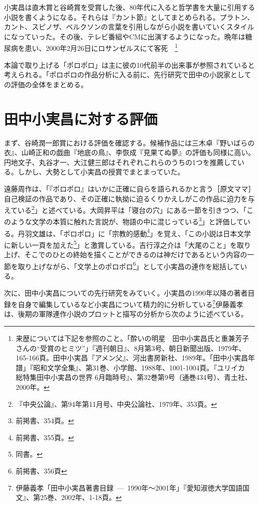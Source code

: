 小実昌は直木賞と谷崎賞を受賞した後、80年代に入ると哲学書を大量に引用する小説を書くようになる。それらは『カント節』としてまとめられる。プラトン、カント、スピノザ、ベルクソンの言葉を引用しながら小説を書いていくスタイルになっていった。その後、テレビ番組やCMに出演するようになった。晩年は糖尿病を患い、2000年2月26日にロサンゼルスにて客死　\footnote{来歴については下記を参照のこと。「酔いの明星　田中小実昌氏と重兼芳子さんの``受賞のヒミツ''」『週刊朝日』、8月第3号、朝日新聞出版、1979年、165-166頁。田中小実昌『アメン父』、河出書房新社、1989年。「田中小実昌年譜」『昭和文学全集』、第31巻、小学館、1988年、1001-1004頁。『ユリイカ　総特集田中小実昌の世界 6月臨時号』、第32巻第9号（通巻434号）、青土社、2000年。}

本論で取り上げる「ポロポロ」は主に彼の10代前半の出来事が参照されていると考えられる。「ポロポロの作品分析に入る前に、先行研究で田中の小説家としての評価の全体をまとめる。


\section{田中小実昌に対する評価}

まず、谷崎潤一郎賞における評価を確認する。候補作品には三木卓『野いばらの衣』、山崎正和の戯曲『地底の鳥』、李恢成『見果てぬ夢』の評価も同様に高い。円地文子、丸谷才一、大江健三郎はそれぞれこれらのうちの1つを推薦している。しかし、大勢として小実昌の授賞でまとまっていた。

遠藤周作は、「『ポロポロ』はいかに正確に自らを語られるかと言う［原文ママ］自己検証の作品であり、その正確に執拗に迫るくりかえしがこの作品に迫力を与えている\footnote{『中央公論』、第94年第11月号、中央公論社、1979年、353頁。}」と述べている。大岡昇平は「寝台の穴」にある一節を引きつつ、「このような文学の本質に触れた言説が、物語の中に混じっている\footnote{前掲書、354頁。}」と評価している。丹羽文雄は、「ポロポロ」に「宗教的感動\footnote{前掲書、355頁。}」を覚え、「この小説は日本文学に新しい一頁を加えた\footnote{同書。}」と激賞している。吉行淳之介は「大尾のこと」を取り上げ、そこでのひとの終始を描くことができるのは神だけであるという内容の一節を取り上げながら、「文学上のポロポロ\footnote{前掲書、356頁}」として小実昌の連作を総括している。

次に、田中小実昌についての先行研究をみていく。小実昌の1990年以降の著者目録を自身で編集しているなど小実昌について精力的に分析している\footnote{伊藤義孝「田中小実昌著書目録~---~1990年～2001年」『愛知淑徳大学国語国文』、第25巻、2002年、1-18頁。}伊藤義孝は、後期の軍隊連作小説のプロットと描写の分析から次のように述べている。


